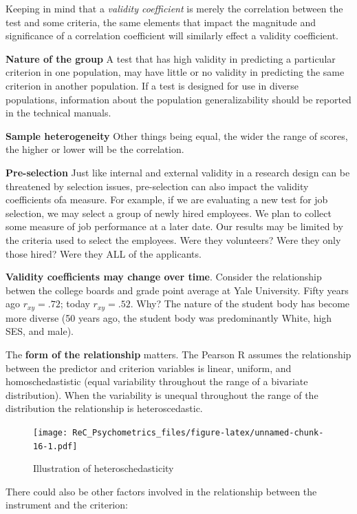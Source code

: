 \documentclass[
  english,
]{book}
\begin{document}
Keeping in mind that a \emph{validity coefficient} is merely the correlation between the test and some criteria, the same elements that impact the magnitude and significance of a correlation coefficient will similarly effect a validity coefficient.

\textbf{Nature of the group} A test that has high validity in predicting a particular criterion in one population, may have little or no validity in predicting the same criterion in another population. If a test is designed for use in diverse populations, information about the population generalizability should be reported in the technical manuals.

\textbf{Sample heterogeneity} Other things being equal, the wider the range of scores, the higher or lower will be the correlation.

\textbf{Pre-selection} Just like internal and external validity in a research design can be threatened by selection issues, pre-selection can also impact the validity coefficients ofa measure. For example, if we are evaluating a new test for job selection, we may select a group of newly hired employees. We plan to collect some measure of job performance at a later date. Our results may be limited by the criteria used to select the employees. Were they volunteers? Were they only those hired? Were they ALL of the applicants.

\textbf{Validity coefficients may change over time}. Consider the relationship betwen the college boards and grade point average at Yale University. Fifty years ago \(r_{xy} = .72\); today \(r_{xy} = .52\). Why? The nature of the student body has become more diverse (50 years ago, the student body was predominantly White, high SES, and male).

The \textbf{form of the relationship} matters. The Pearson R assumes the relationship between the predictor and criterion variables is linear, uniform, and homoschedastistic (equal variability throughout the range of a bivariate distribution). When the variability is unequal throughout the range of the distribution the relationship is heteroscedastic.

\begin{figure}
\centering
\texttt{[image: ReC\_Psychometrics\_files/figure-latex/unnamed-chunk-16-1.pdf]}
\caption{\label{fig:unnamed-chunk-16}Illustration of heteroschedasticity}
\end{figure}

There could also be other factors involved in the relationship between the instrument and the criterion:
\end{document}
